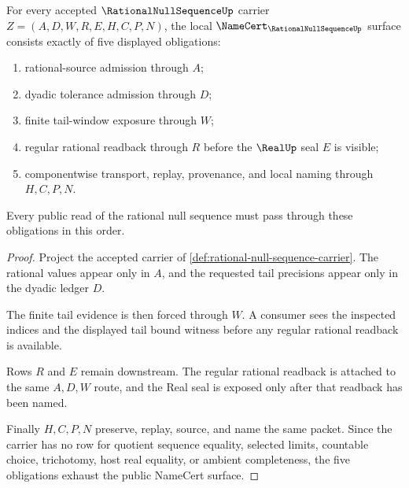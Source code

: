\begin{theorem}
\label{thm:rational-null-sequence-namecert-obligations}
For every accepted $\RationalNullSequenceUp$ carrier $Z=(A,D,W,R,E,H,C,P,N)$, the local $\NameCert_{\RationalNullSequenceUp}$ surface consists exactly of five displayed obligations:
\begin{enumerate}
\item rational-source admission through $A$;
\item dyadic tolerance admission through $D$;
\item finite tail-window exposure through $W$;
\item regular rational readback through $R$ before the $\RealUp$ seal $E$ is visible;
\item componentwise transport, replay, provenance, and local naming through $H,C,P,N$.
\end{enumerate}
Every public read of the rational null sequence must pass through these obligations in this order.
\end{theorem}
\begin{proof}
Project the accepted carrier of \autoref{def:rational-null-sequence-carrier}. The rational values appear only in $A$, and the requested tail precisions appear only in the dyadic ledger $D$.

The finite tail evidence is then forced through $W$. A consumer sees the inspected indices and the displayed tail bound witness before any regular rational readback is available.

Rows $R$ and $E$ remain downstream. The regular rational readback is attached to the same $A,D,W$ route, and the Real seal is exposed only after that readback has been named.

Finally $H,C,P,N$ preserve, replay, source, and name the same packet. Since the carrier has no row for quotient sequence equality, selected limits, countable choice, trichotomy, host real equality, or ambient completeness, the five obligations exhaust the public NameCert surface.
\end{proof}


